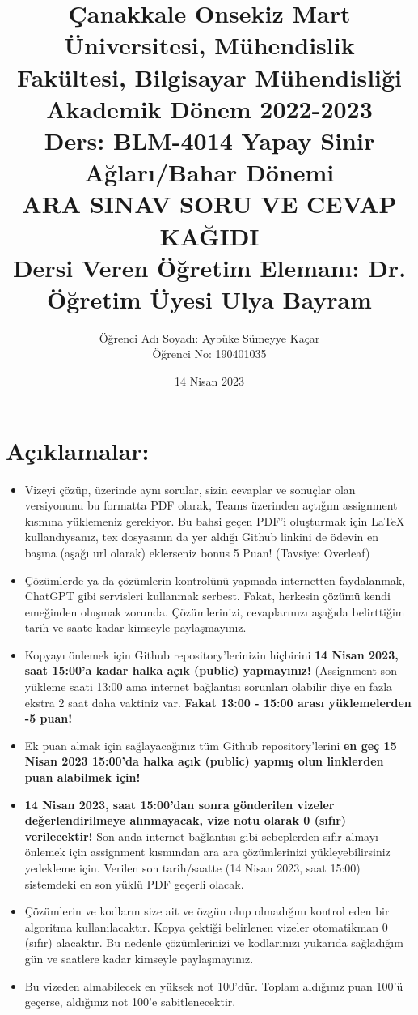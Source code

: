 \documentclass[11pt]{article}
\title{Çanakkale Onsekiz Mart Üniversitesi, Mühendislik Fakültesi, Bilgisayar Mühendisliği Akademik Dönem 2022-2023\\
Ders: BLM-4014 Yapay Sinir Ağları/Bahar Dönemi\\ 
ARA SINAV SORU VE CEVAP KAĞIDI\\
Dersi Veren Öğretim Elemanı: Dr. Öğretim Üyesi Ulya Bayram}
\author{%
\begin{minipage}{\textwidth}
\raggedright
Öğrenci Adı Soyadı: Aybüke Sümeyye Kaçar\\ %
Öğrenci No: 190401035
\end{minipage}%
}
\date{14 Nisan 2023}
\begin{document}
\maketitle

\vspace{-.5in}
\section*{Açıklamalar:}
\begin{itemize}
    \item Vizeyi çözüp, üzerinde aynı sorular, sizin cevaplar ve sonuçlar olan versiyonunu bu formatta PDF olarak, Teams üzerinden açtığım assignment kısmına yüklemeniz gerekiyor. Bu bahsi geçen PDF'i oluşturmak için LaTeX kullandıysanız, tex dosyasının da yer aldığı Github linkini de ödevin en başına (aşağı url olarak) eklerseniz bonus 5 Puan! (Tavsiye: Overleaf)
    \item Çözümlerde ya da çözümlerin kontrolünü yapmada internetten faydalanmak, ChatGPT gibi servisleri kullanmak serbest. Fakat, herkesin çözümü kendi emeğinden oluşmak zorunda. Çözümlerinizi, cevaplarınızı aşağıda belirttiğim tarih ve saate kadar kimseyle paylaşmayınız. 
    \item Kopyayı önlemek için Github repository'lerinizin hiçbirini \textbf{14 Nisan 2023, saat 15:00'a kadar halka açık (public) yapmayınız!} (Assignment son yükleme saati 13:00 ama internet bağlantısı sorunları olabilir diye en fazla ekstra 2 saat daha vaktiniz var. \textbf{Fakat 13:00 - 15:00 arası yüklemelerden -5 puan!}
    \item Ek puan almak için sağlayacağınız tüm Github repository'lerini \textbf{en geç 15 Nisan 2023 15:00'da halka açık (public) yapmış olun linklerden puan alabilmek için!}
    \item \textbf{14 Nisan 2023, saat 15:00'dan sonra gönderilen vizeler değerlendirilmeye alınmayacak, vize notu olarak 0 (sıfır) verilecektir!} Son anda internet bağlantısı gibi sebeplerden sıfır almayı önlemek için assignment kısmından ara ara çözümlerinizi yükleyebilirsiniz yedekleme için. Verilen son tarih/saatte (14 Nisan 2023, saat 15:00) sistemdeki en son yüklü PDF geçerli olacak.
    \item Çözümlerin ve kodların size ait ve özgün olup olmadığını kontrol eden bir algoritma kullanılacaktır. Kopya çektiği belirlenen vizeler otomatikman 0 (sıfır) alacaktır. Bu nedenle çözümlerinizi ve kodlarınızı yukarıda sağladığım gün ve saatlere kadar kimseyle paylaşmayınız.
    \item Bu vizeden alınabilecek en yüksek not 100'dür. Toplam aldığınız puan 100'ü geçerse, aldığınız not 100'e sabitlenecektir.

\end{itemize}
\end{document}
